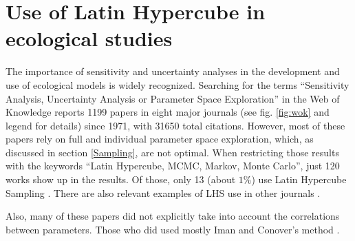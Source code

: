 \section{Use of Latin Hypercube in ecological studies}\label{Studies}
The importance of sensitivity and uncertainty analyses in the development 
and use of ecological models is widely recognized. Searching for the terms
``Sensitivity Analysis, Uncertainty Analysis or Parameter Space
Exploration'' in the Web of Knowledge reports 1199 papers in eight major
journals (see fig. \ref{fig:wok} and legend for details) since 1971, 
with 31650 total
citations. However,
most of these papers rely on full and individual parameter space
exploration, which, as discussed in section \ref{Sampling}, are not
optimal. When restricting those results with the keywords ``Latin Hypercube,
MCMC, Markov, Monte Carlo'', just 120 works show up in the results. Of 
those, only 13 (about $1\%$) use Latin Hypercube Sampling 
\cite{Berthaume12, Confalonieri10, Meyer07, Tiemeyer07, Xu05,
Moore04, Shirley03, Duchesne03, Reed84, Marino08, Nathan01, Hamilton10,
Lovvorn96}. There are also relevant examples of LHS use in other
journals \cite{Estill12, Fisher10, Thebault10}.

Also, many of these papers did not explicitly take into account the
correlations between parameters. Those who did used mostly Iman and 
Conover's method \cite{ImanConover82}. 

